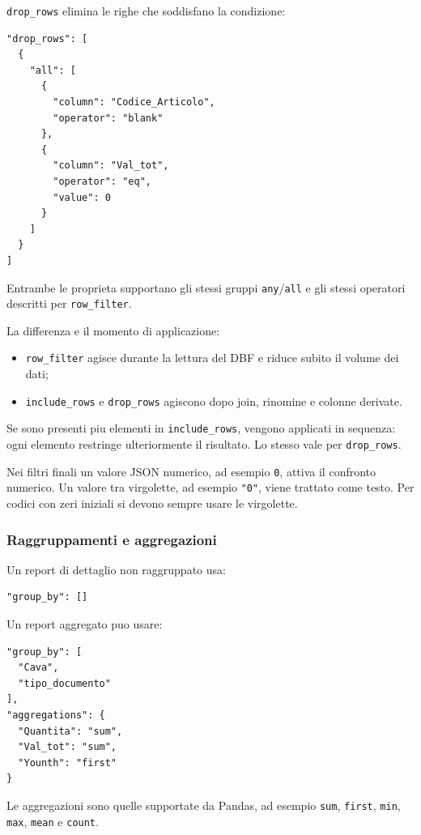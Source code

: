 \texttt{drop\_rows} elimina le righe che soddisfano la condizione:

\begin{lstlisting}
"drop_rows": [
  {
    "all": [
      {
        "column": "Codice_Articolo",
        "operator": "blank"
      },
      {
        "column": "Val_tot",
        "operator": "eq",
        "value": 0
      }
    ]
  }
]
\end{lstlisting}

Entrambe le proprieta supportano gli stessi gruppi \texttt{any}/\texttt{all}
e gli stessi operatori descritti per \texttt{row\_filter}.

La differenza e il momento di applicazione:

\begin{itemize}
  \item \texttt{row\_filter} agisce durante la lettura del DBF e riduce subito
        il volume dei dati;
  \item \texttt{include\_rows} e \texttt{drop\_rows} agiscono dopo join,
        rinomine e colonne derivate.
\end{itemize}

Se sono presenti piu elementi in \texttt{include\_rows}, vengono applicati in
sequenza: ogni elemento restringe ulteriormente il risultato. Lo stesso vale
per \texttt{drop\_rows}.

Nei filtri finali un valore JSON numerico, ad esempio \texttt{0}, attiva il
confronto numerico. Un valore tra virgolette, ad esempio \texttt{"0"}, viene
trattato come testo. Per codici con zeri iniziali si devono sempre usare le
virgolette.

\subsubsection{Raggruppamenti e aggregazioni}

Un report di dettaglio non raggruppato usa:

\begin{lstlisting}
"group_by": []
\end{lstlisting}

Un report aggregato puo usare:

\begin{lstlisting}
"group_by": [
  "Cava",
  "tipo_documento"
],
"aggregations": {
  "Quantita": "sum",
  "Val_tot": "sum",
  "Younth": "first"
}
\end{lstlisting}

Le aggregazioni sono quelle supportate da Pandas, ad esempio \texttt{sum},
\texttt{first}, \texttt{min}, \texttt{max}, \texttt{mean} e \texttt{count}.

